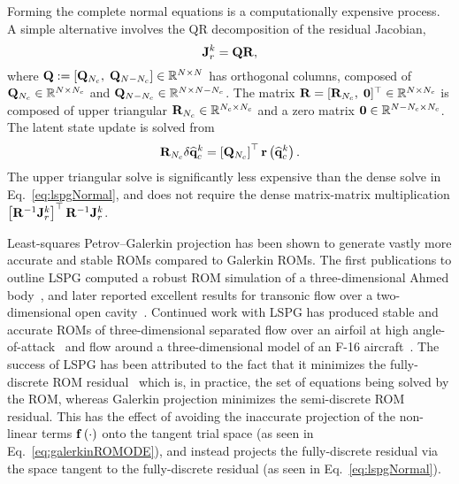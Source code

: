 Forming the complete normal equations is a computationally expensive process. A simple alternative involves the QR decomposition of the residual Jacobian,
%
\begin{equation}
    \mathbf{J}_{r}^{k} = \mathbf{QR},
\end{equation}
%
where $\mathbf{Q} := \left[\mathbf{Q}_{N_c}, \; \mathbf{Q}_{N-N_c}\right] \in \mathbb{R}^{N \times N}$ has orthogonal columns, composed of $\mathbf{Q}_{N_c} \in \mathbb{R}^{N \times N_c}$ and $\mathbf{Q}_{N - N_c} \in \mathbb{R}^{N \times N - N_c}$. The matrix $\mathbf{R} = [\mathbf{R}_{N_c}, \; \mathbf{0}]^\top \in \mathbb{R}^{N \times N_c}$ is composed of upper triangular $\mathbf{R}_{N_c} \in \mathbb{R}^{N_c \times N_c}$ and a zero matrix $\mathbf{0} \in \mathbb{R}^{N - N_c \times N_c}$. The latent state update is solved from
%
\begin{equation}
    \mathbf{R}_{N_c} \delta \mathbf{\widehat{q}}_{c}^{k} = \left[\mathbf{Q}_{N_c}\right]^\top \mathbf{r}\left(\mathbf{\widehat{q}}_{c}^{k}\right).
\end{equation}
%
The upper triangular solve is significantly less expensive than the dense solve in Eq.~\ref{eq:lspgNormal}, and does not require the dense matrix-matrix multiplication $\left[\resScaleInv \jacobRes^{\newtonIdx}\right]^\top \resScaleInv \jacobRes^{\newtonIdx}$.

Least-squares Petrov--Galerkin projection has been shown to generate vastly more accurate and stable ROMs compared to Galerkin ROMs. The first publications to outline LSPG computed a robust ROM simulation of a three-dimensional Ahmed body~\cite{Carlberg2010,Carlberg2013}, and later reported excellent results for transonic flow over a two-dimensional open cavity~\cite{Carlberg2017}. Continued work with LSPG has produced stable and accurate ROMs of three-dimensional separated flow over an airfoil at high angle-of-attack~\cite{Grimberg2020Hyper} and flow around a three-dimensional model of an F-16 aircraft~\cite{Grimberg2021}. The success of LSPG has been attributed to the fact that it minimizes the fully-discrete ROM residual~\cite{Grimberg2020} which is, in practice, the set of equations being solved by the ROM, whereas Galerkin projection minimizes the semi-discrete ROM residual. This has the effect of avoiding the inaccurate projection of the non-linear terms $\mathbf{f} \left(\cdot\right)$ onto the tangent trial space (as seen in Eq.~\ref{eq:galerkinROMODE}), and instead projects the fully-discrete residual via the space tangent to the fully-discrete residual (as seen in Eq.~\ref{eq:lspgNormal}).

